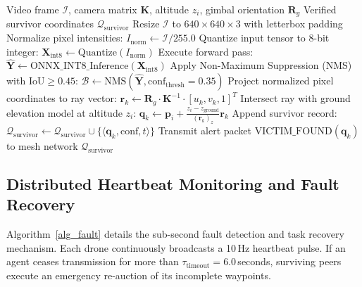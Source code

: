 \documentclass[journal]{IEEEtran}
\begin{document}
\begin{algorithm}[!t]
\caption{Embedded INT8 Real-Time Detection and Geolocation}
\label{alg_perception}
\begin{algorithmic}[1]
\REQUIRE Video frame $\mathcal{I}$, camera matrix $\mathbf{K}$, altitude $z_i$, gimbal orientation $\mathbf{R}_g$
\ENSURE Verified survivor coordinates $\mathcal{Q}_{\text{survivor}}$
\STATE Resize $\mathcal{I}$ to $640 \times 640 \times 3$ with letterbox padding
\STATE Normalize pixel intensities: $I_{\text{norm}} \leftarrow \mathcal{I} / 255.0$
\STATE Quantize input tensor to 8-bit integer: $\mathbf{X}_{\text{int8}} \leftarrow \text{Quantize}(I_{\text{norm}})$
\STATE Execute forward pass: $\hat{\mathbf{Y}} \leftarrow \text{ONNX\_INT8\_Inference}(\mathbf{X}_{\text{int8}})$
\STATE Apply Non-Maximum Suppression (NMS) with $\text{IoU} \ge 0.45$:
\STATE \quad $\mathcal{B} \leftarrow \text{NMS}(\hat{\mathbf{Y}}, \text{conf}_{\text{thresh}} = 0.35)$
        \STATE Project normalized pixel coordinates to ray vector:
        \STATE \quad $\mathbf{r}_k \leftarrow \mathbf{R}_g \cdot \mathbf{K}^{-1} \cdot [u_k, v_k, 1]^T$
        \STATE Intersect ray with ground elevation model at altitude $z_i$:
        \STATE \quad $\mathbf{q}_k \leftarrow \mathbf{p}_i + \frac{z_i - z_{\text{ground}}}{(\mathbf{r}_k)_z} \mathbf{r}_k$
        \STATE Append survivor record: $\mathcal{Q}_{\text{survivor}} \leftarrow \mathcal{Q}_{\text{survivor}} \cup \{\langle \mathbf{q}_k, \text{conf}, t \rangle\}$
        \STATE Transmit alert packet $\text{VICTIM\_FOUND}(\mathbf{q}_k)$ to mesh network
    \ENDIF
\ENDFOR
\RETURN $\mathcal{Q}_{\text{survivor}}$
\end{algorithmic}
\end{algorithm}

\subsection{Distributed Heartbeat Monitoring and Fault Recovery}
Algorithm~\ref{alg_fault} details the sub-second fault detection and task recovery mechanism. Each drone continuously broadcasts a 10\,Hz heartbeat pulse. If an agent ceases transmission for more than $\tau_{\text{timeout}} = 6.0$\,seconds, surviving peers execute an emergency re-auction of its incomplete waypoints.
\end{document}

